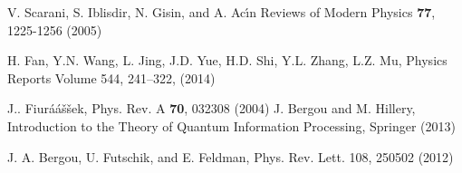 \documentclass[aps,prl,twocolumn,showpacs]{revtex4}
\begin{document}
\begin{thebibliography}{99}
 V. Scarani, S. Iblisdir, N. Gisin, and A. Ac\'{\i}n Reviews of Modern Physics \textbf{77}, 1225-1256 (2005)

 H. Fan, Y.N. Wang, L. Jing, J.D. Yue, H.D. Shi, Y.L. Zhang, L.Z. Mu, Physics Reports Volume 544, 241–322, (2014)

 J.. Fiur{\' a}á{\v s}šek,  Phys. Rev. A \textbf{70}, 032308 (2004)
 J. Bergou and M. Hillery, Introduction to the Theory of Quantum Information Processing, Springer (2013)





 J. A. Bergou, U. Futschik, and E. Feldman, Phys. Rev. Lett. 108, 250502 (2012)


\end{thebibliography}     
\end{document}

